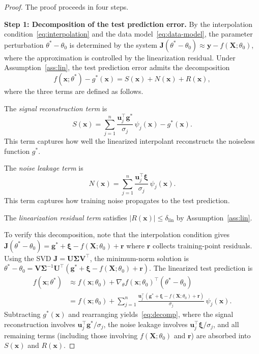 \documentclass[12pt]{amsart}
\theoremstyle{definition}
\theoremstyle{remark}
\newcommand{\bx}{\mathbf{x}}
\newcommand{\bX}{\mathbf{X}}
\newcommand{\bJ}{\mathbf{J}}
\newcommand{\bU}{\mathbf{U}}
\newcommand{\bV}{\mathbf{V}}
\newcommand{\bu}{\mathbf{u}}
\newcommand{\bg}{\mathbf{g}}
\newcommand{\abs}[1]{\left\lvert #1 \right\rvert}
\begin{document}
\begin{proof}
The proof proceeds in four steps.

\medskip
\noindent\textbf{Step 1: Decomposition of the test prediction error.}
By the interpolation condition~\eqref{eq:interpolation} and the data
model~\eqref{eq:data-model}, the parameter perturbation
$\theta^{*} - \theta_{0}$ is determined by the system
$\bJ(\theta^{*} - \theta_{0}) \approx \mathbf{y} - f(\bX; \theta_{0})$, where
the approximation is controlled by the linearization residual.  Under
Assumption~\ref{ass:lin}, the test prediction error admits the decomposition
\begin{equation}\label{eq:decomp}
  f(\bx; \theta^{*}) - g^{*}(\bx) = S(\bx) + N(\bx) + R(\bx),
\end{equation}
where the three terms are defined as follows.

The \emph{signal reconstruction term} is
\begin{equation}\label{eq:signal-term}
  S(\bx) = \sum_{j=1}^{n} \frac{\bu_{j}^{\top} \bg^{*}}{\sigma_{j}}\,
            \psi_{j}(\bx) - g^{*}(\bx).
\end{equation}
This term captures how well the linearized interpolant reconstructs the noiseless
function $g^{*}$.

The \emph{noise leakage term} is
\begin{equation}\label{eq:noise-term}
  N(\bx) = \sum_{j=1}^{n} \frac{\bu_{j}^{\top} \boldsymbol{\xi}}{\sigma_{j}}\,
            \psi_{j}(\bx).
\end{equation}
This term captures how training noise propagates to the test prediction.

The \emph{linearization residual term} satisfies $\abs{R(\bx)} \leq \delta_{\mathrm{lin}}$ by Assumption~\ref{ass:lin}.

To verify this decomposition, note that the interpolation condition gives
$\bJ(\theta^{*} - \theta_{0}) = \bg^{*} + \boldsymbol{\xi} - f(\bX; \theta_{0}) + \mathbf{r}$
where $\mathbf{r}$ collects training-point residuals.  Using the SVD
$\bJ = \bU\boldsymbol{\Sigma}\bV^{\top}$, the minimum-norm solution is
$\theta^{*} - \theta_{0} = \bV\boldsymbol{\Sigma}^{-1}\bU^{\top}(\bg^{*} + \boldsymbol{\xi} - f(\bX;\theta_{0}) + \mathbf{r})$.
The linearized test prediction is
\begin{align*}
  f(\bx; \theta^{*})
  &\approx f(\bx; \theta_{0})
    + \nabla_{\theta} f(\bx; \theta_{0})^{\top}(\theta^{*} - \theta_{0}) \\
  &= f(\bx; \theta_{0})
    + \sum_{j=1}^{n} \frac{\bu_{j}^{\top}(\bg^{*} + \boldsymbol{\xi}
      - f(\bX;\theta_{0}) + \mathbf{r})}{\sigma_{j}}\,\psi_{j}(\bx).
\end{align*}
Subtracting $g^{*}(\bx)$ and rearranging yields~\eqref{eq:decomp}, where the
signal reconstruction involves $\bu_{j}^{\top}\bg^{*}/\sigma_{j}$, the noise
leakage involves $\bu_{j}^{\top}\boldsymbol{\xi}/\sigma_{j}$, and all
remaining terms (including those involving $f(\bX;\theta_{0})$ and
$\mathbf{r}$) are absorbed into $S(\bx)$ and $R(\bx)$.


\end{proof}
\end{document}
